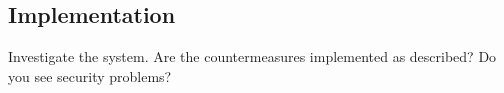 \subsection{Implementation}

Investigate the system. Are the countermeasures implemented as described? Do you see security problems?


